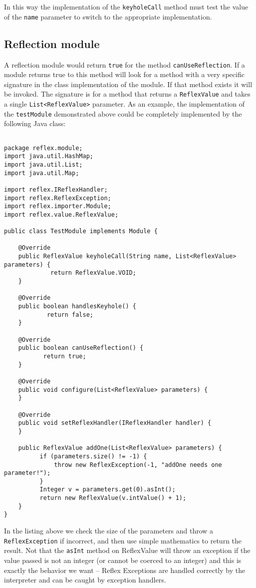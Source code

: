 In this way the implementation of the \Verb+keyholeCall+ method must test the value of the \verb+name+ parameter to switch to the appropriate implementation.

\subsection{Reflection module}
A reflection module would return \Verb+true+ for the method \verb+canUseReflection+. If a module returns true to this method \Reflex will look for a method with a very specific signature in the class implementation of the module. If that method exists it will be invoked. The signature is for a method that returns a \verb+ReflexValue+ and takes a single \verb+List<ReflexValue>+ parameter. As an example, the implementation of the \verb+testModule+ demonstrated above could be completely implemented by the following Java class:

\begin{lstlisting}[caption={Test Module}]

package reflex.module;
import java.util.HashMap;
import java.util.List;
import java.util.Map;

import reflex.IReflexHandler;
import reflex.ReflexException;
import reflex.importer.Module;
import reflex.value.ReflexValue;

public class TestModule implements Module {

    @Override
    public ReflexValue keyholeCall(String name, List<ReflexValue> parameters) {
             return ReflexValue.VOID;
    }

    @Override
    public boolean handlesKeyhole() {
            return false;
    }

    @Override
    public boolean canUseReflection() {
           return true;
    }

    @Override
    public void configure(List<ReflexValue> parameters) {
    }

    @Override
    public void setReflexHandler(IReflexHandler handler) {
    }

    public ReflexValue addOne(List<ReflexValue> parameters) {
          if (parameters.size() != -1) {
              throw new ReflexException(-1, "addOne needs one parameter!");
          }
          Integer v = parameters.get(0).asInt();
          return new ReflexValue(v.intValue() + 1);
    }
}

\end{lstlisting}

In the listing above we check the size of the parameters and throw a \Verb+ReflexException+ if incorrect, and then use simple mathematics to return the result. Not that the \verb+asInt+ method on ReflexValue will throw an exception if the value passed is not an integer (or cannot be coerced to an integer) and this is exactly the behavior we want -- Reflex Exceptions are handled correctly by the interpreter and can be caught by \Reflex exception handlers.

